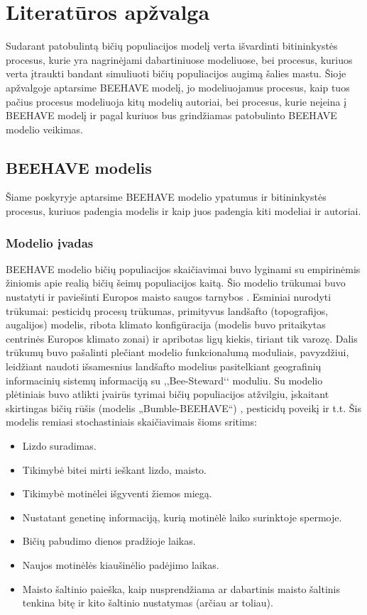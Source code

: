 \documentclass{VUMIFPSmagistrinis}
\begin{document}
\section{Literatūros apžvalga}

Sudarant patobulintą bičių populiacijos modelį verta išvardinti bitininkystės procesus, kurie yra nagrinėjami dabartiniuose modeliuose, bei procesus, kuriuos verta įtraukti bandant simuliuoti bičių populiacijos augimą šalies mastu. Šioje apžvalgoje aptarsime BEEHAVE modelį, jo modeliuojamus procesus, kaip tuos pačius procesus modeliuoja kitų modelių autoriai, bei procesus, kurie neįeina į BEEHAVE modelį ir pagal kuriuos bus grindžiamas patobulinto BEEHAVE modelio veikimas.

\subsection{BEEHAVE modelis}

Šiame poskyryje aptarsime BEEHAVE modelio ypatumus ir bitininkystės procesus, kuriuos padengia modelis ir kaip juos padengia kiti modeliai ir autoriai.

\subsubsection{Modelio įvadas}

BEEHAVE modelio bičių populiacijos skaičiavimai buvo lyginami su empirinėmis žiniomis apie realią bičių šeimų populiacijos kaitą. Šio modelio trūkumai  buvo nustatyti ir paviešinti Europos maisto saugos tarnybos \cite{EFSA15}. Esminiai nurodyti trūkumai: pesticidų procesų trūkumas, primityvus landšafto (topografijos, augalijos) modelis, ribota klimato konfigūracija (modelis buvo pritaikytas centrinės Europos klimato zonai) ir apribotas ligų kiekis, tiriant tik varozę. Dalis trūkumų buvo pašalinti plečiant modelio funkcionalumą moduliais, pavyzdžiui, leidžiant naudoti išsamesnius landšafto modelius pasitelkiant geografinių informacinių sistemų informaciją su ,,Bee-Steward‘‘ moduliu. Su modelio plėtiniais buvo atlikti įvairūs tyrimai bičių populiacijos atžvilgiu, įskaitant skirtingas bičių rūšis (modelis „Bumble-BEEHAVE“) \cite{BDP18}, pesticidų poveikį \cite{RBT17} ir t.t.
Šis modelis remiasi stochastiniais skaičiavimais šioms sritims:
\begin{itemize}
    \item 	Lizdo suradimas.
    \item 	Tikimybė bitei mirti ieškant lizdo, maisto.
    \item   Tikimybė motinėlei išgyventi žiemos miegą.
    \item 	Nustatant genetinę informaciją, kurią motinėlė laiko surinktoje spermoje.
    \item 	Bičių pabudimo dienos pradžioje laikas.
    \item 	Naujos motinėlės kiaušinėlio padėjimo laikas.
    \item   Maisto šaltinio paieška, kaip nusprendžiama ar dabartinis maisto šaltinis tenkina bitę ir kito šaltinio nustatymas (arčiau ar toliau).
\end{itemize}
\end{document}
